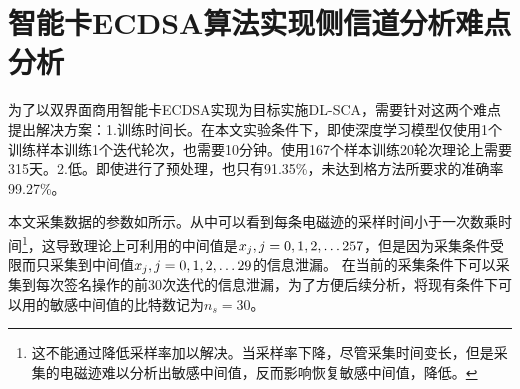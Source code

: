 {	%
	
	
	
	\section{智能卡ECDSA算法实现侧信道分析难点分析}\label{sec:hardpoint}
	为了以双界面商用智能卡ECDSA实现为目标实施DL-SCA，需要针对这两个难点提出解决方案：1.训练时间长。在本文实验条件下，即使深度学习模型仅使用1个训练样本训练1个迭代轮次，也需要10分钟。使用167个样本训练20轮次理论上需要315天。2.\zyx 低。即使进行了预处理，\zyx 也只有91.35\%，未达到格方法所要求的准确率99.27\%。
	
	本文采集数据的参数如所示。从中可以看到每条电磁迹的采样时间小于一次数乘时间\footnote{这不能通过降低采样率加以解决。当采样率下降，尽管采集时间变长，但是采集的电磁迹难以分析出敏感中间值，反而影响恢复敏感中间值，降低\zyx 。}，这导致理论上可利用的中间值是$x_j,j=0,1,2,\dots257$，但是因为采集条件受限而只采集到中间值$x_j,j=0,1,2,\dots 29$的信息泄漏。%
	在当前的采集条件下可以采集到每次签名操作的前30次迭代的信息泄漏，为了方便后续分析，将现有条件下可以用的敏感中间值的比特数记为$n_s=30$。
	
}
